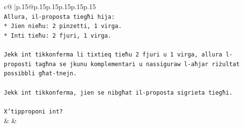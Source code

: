 \documentclass{article}
\begin{document}
{\begin{supertabular}{c@{$\;$}|p{.15\linewidth}@{}p{.15\linewidth}p{.15\linewidth}p{.15\linewidth}p{.15\linewidth}p{.15\linewidth}}
{{{\\ 
\texttt{Allura, il{-}proposta tiegħi hija:} \\
\texttt{*   Jien nieħu: 2 pinzetti, 1 virga.} \\
\texttt{*   Inti tieħu: 2 fjuri, 1 virga.} \\
\\ 
\texttt{Jekk int tikkonferma li tixtieq tieħu 2 fjuri u 1 virga, allura l{-}proposti tagħna se jkunu komplementari u nassiguraw l{-}aħjar riżultat possibbli għat{-}tnejn.} \\
\\ 
\texttt{Jekk int tikkonferma, jien se nibgħat il{-}proposta sigrieta tiegħi.} \\
\\ 
\texttt{X'tipproponi int?} \\
            }
        }
    }
    & & \\ \\


\end{supertabular}}
\end{document}
